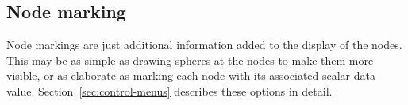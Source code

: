 
\subsection{Node marking}
\label{sec:displayleads} 

Node markings are just additional information added to the display of the
nodes.  This may be as simple as drawing spheres at the nodes to make them
more visible, or as elaborate as marking each node with its associated
scalar data value.  Section~\ref{sec:control-menus} describes these options
in detail.

